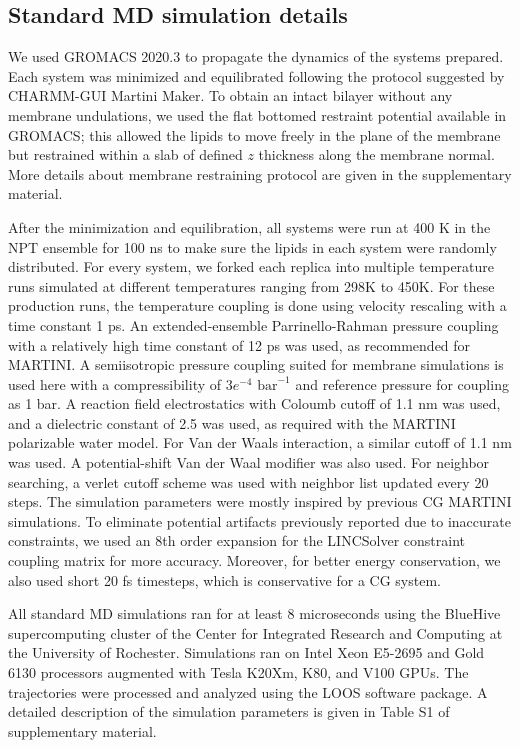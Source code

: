 \documentclass{biophys-new}
\begin{document}
\subsection*{Standard MD simulation details}

We used GROMACS 2020.3\cite{Abraham2015} to propagate the dynamics of the systems prepared. 
Each system was minimized and equilibrated following the protocol suggested by CHARMM-GUI Martini Maker.
To obtain an intact bilayer without any membrane undulations, we used  
the flat bottomed restraint potential available in GROMACS; this allowed the lipids to move freely in the plane of the membrane but restrained within a slab of defined $z$ thickness along the membrane normal.  More details about membrane restraining protocol are given in the supplementary material.

After the minimization and equilibration, all systems were run at 400 K in the NPT ensemble for 100 ns to make sure the lipids in each system were randomly distributed.
For every system, we forked each replica into multiple temperature runs simulated at different temperatures ranging from 298K to 450K.
For these production runs, the temperature coupling is done using velocity rescaling\cite{Bussi2007} with a time constant 1 ps.
An extended-ensemble Parrinello-Rahman pressure coupling\cite{Parrinello1981} with a relatively high time constant of 12 ps was used, as recommended for MARTINI.  A semiisotropic pressure coupling suited for membrane simulations is used here with a compressibility of $3e^{-4}$ $\text{bar}^{-1}$ and reference pressure for coupling as 1 bar.
A reaction field electrostatics with Coloumb cutoff of 1.1 nm was used, and 
a dielectric constant of 2.5 was used, as required with the MARTINI polarizable water model.
For Van der Waals interaction, a similar cutoff of 1.1 nm was used.
A potential-shift Van der Waal modifier was also used.
For neighbor searching, a verlet cutoff scheme was used with neighbor list updated every 20 steps.
The simulation parameters were mostly inspired by previous CG MARTINI simulations\cite{DeJong2016}. 
To eliminate potential artifacts previously reported due to inaccurate constraints\cite{Javanainen2020}, we used an 8th order expansion for the LINCSolver constraint coupling matrix\cite{Hess1997} for more accuracy.
Moreover, for better energy conservation, we also used short 20 fs timesteps, which is conservative for a CG system.

All standard MD simulations ran for at least 8 microseconds using the BlueHive supercomputing cluster of the Center for Integrated Research and Computing at the University of Rochester.
Simulations ran on Intel Xeon E5-2695 and Gold 6130 processors augmented with Tesla K20Xm, K80, and V100 GPUs.   
The trajectories were processed and analyzed using the LOOS software package.
A detailed description of the simulation parameters is given in Table S1 of supplementary material. 
\end{document}
